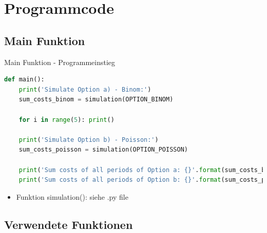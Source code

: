 \section{Programmcode}
\subsection{Main Funktion}
\begin{frame}[fragile]{Main Funktion - Programmeinstieg}
  \begin{lstlisting}[language=python]
def main():
    print('Simulate Option a) - Binom:')
    sum_costs_binom = simulation(OPTION_BINOM)
    
    for i in range(5): print()
    
    print('Simulate Option b) - Poisson:')
    sum_costs_poisson = simulation(OPTION_POISSON)
    
    print('Sum costs of all periods of Option a: {}'.format(sum_costs_binom))
    print('Sum costs of all periods of Option b: {}'.format(sum_costs_poisson))
\end{lstlisting}
\logopythonbottom

  \begin{itemize}
  	\item Funktion simulation(): siehe .py file
  \end{itemize}
\end{frame}

\subsection{Verwendete Funktionen}
%
%




